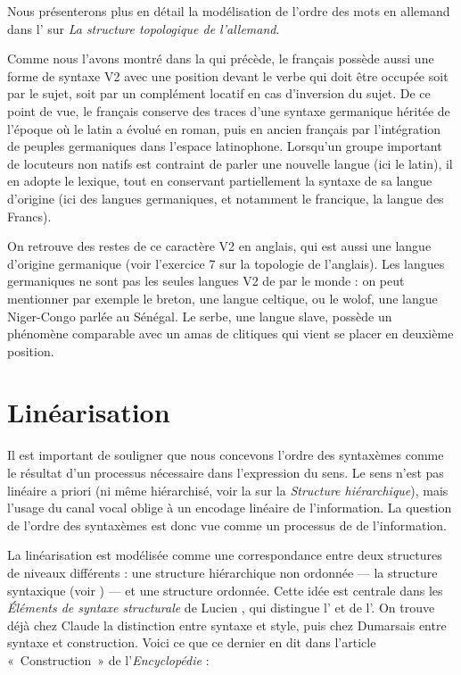 {Nous présenterons plus en détail la modélisation de l'ordre des mots en allemand dans l' sur \textit{La structure topologique de l'allemand}.

    Comme nous l’avons montré dans la  qui précède, le français possède aussi une forme de syntaxe V2 avec une position devant le verbe qui doit être occupée soit par le sujet, soit par un complément locatif en cas d’inversion du sujet. De ce point de vue, le français conserve des traces d’une syntaxe germanique héritée de l’époque où le latin a évolué en roman, puis en ancien français par l’intégration de peuples germaniques dans l’espace latinophone. Lorsqu’un groupe important de locuteurs non natifs est contraint de parler une nouvelle langue (ici le latin), il en adopte le lexique, tout en conservant partiellement la syntaxe de sa langue d’origine (ici des langues germaniques, et notamment le francique, la langue des Francs).

    On retrouve des restes de ce caractère V2 en anglais, qui est aussi une langue d’origine germanique (voir l’exercice 7 sur la topologie de l’anglais). Les langues germaniques ne sont pas les seules langues V2 de par le monde : on peut mentionner par exemple le breton, une langue celtique, ou le wolof, une langue Niger-Congo parlée au Sénégal. Le serbe, une langue slave, possède un phénomène comparable avec un amas de clitiques qui vient se placer en deuxième position.
}
\section{Linéarisation}\label{sec:3.5.6}

Il est important de souligner que nous concevons l’ordre des syntaxèmes comme le résultat d’un processus nécessaire dans l’expression du sens. Le sens n’est pas linéaire a priori (ni même hiérarchisé, voir la  sur la \textit{Structure hiérarchique}), mais l’usage du canal vocal oblige à un encodage linéaire de l’information. La question de l’ordre des syntaxèmes est donc vue comme un processus de  de l’information.

La linéarisation est modélisée comme une correspondance entre deux structures de niveaux différents : une structure hiérarchique non ordonnée — la structure syntaxique (voir ) — et une structure ordonnée. Cette idée est centrale dans les \textit{Éléments de syntaxe structurale} de Lucien \citet{tesniere1959elements}, qui distingue l’ et de l’. On trouve déjà chez Claude \citet{buffier1709grammaire} la distinction entre syntaxe et style, puis chez Dumarsais entre syntaxe et construction. Voici ce que ce dernier en dit dans l’article «~Construction~» de l’\textit{Encyclopédie} :

